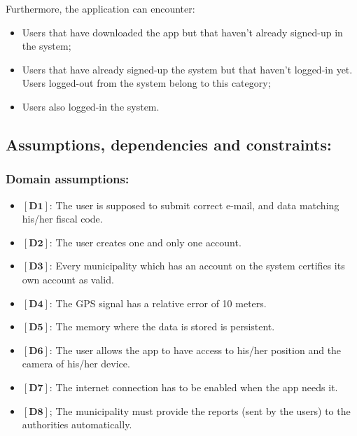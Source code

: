 \documentclass[titlepage]{article}
\begin{document}
Furthermore, the application can encounter:
\begin{itemize}
	\item Users that have downloaded the app but that haven't already signed-up in the system;
	\item Users that have already signed-up the system but that haven't logged-in yet. Users logged-out from the system belong to this category;
	\item Users also logged-in the system.\\
	
\end{itemize}

 



\subsection{Assumptions, dependencies and constraints: }
\subsubsection{Domain assumptions: }
\begin{itemize}
	\item $[\textbf{D1}]$: The user is supposed to submit correct e-mail, and data matching his/her fiscal code.
	\item $[\textbf{D2}]$: The user creates one and only one account.
	\item $[\textbf{D3}]$: Every municipality which has an account on the system certifies its own account as valid.
	\item $[\textbf{D4}]$: The GPS signal has a relative error of 10 meters.
	\item $[\textbf{D5}]$: The memory where the data is stored is persistent.
	\item$[\textbf{D6}]$: The user allows the app to have access to his/her position and the camera of his/her device.
	\item $[\textbf{D7}]$: The internet connection has to be enabled when the app needs it.
	\item $[\textbf{D8}]$; The municipality must provide the reports (sent by the users) to the authorities automatically.
	
\end{itemize}
\end{document}
